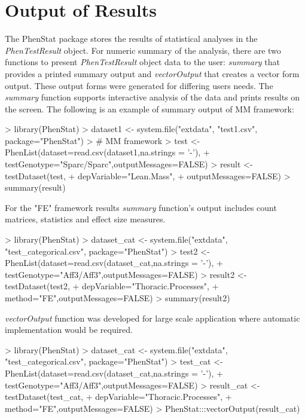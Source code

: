 \documentclass[a4paper]{article}
\begin{document}
\section{Output of Results}
The PhenStat package stores the results of statistical analyses in the \textit{PhenTestResult} object.
For numeric summary of the analysis, there are two functions to present \textit{PhenTestResult} object data to the user:
\textit{summary} that provides a printed summary output and \textit{vectorOutput} that creates a vector form output.
These output forms were generated for differing users needs.
\newline\newline
The \textit{summary} function supports interactive analysis of the data and prints results on the screen.
\newline\newline
The following is an example of summary output of MM framework:
\begin{Schunk}
\begin{Sinput}
> library(PhenStat)
> dataset1 <- system.file("extdata", "test1.csv", package="PhenStat")
> # MM framework
> test <- PhenList(dataset=read.csv(dataset1,na.strings = '-'),
+                  testGenotype="Sparc/Sparc",outputMessages=FALSE)
> result <- testDataset(test,
+                       depVariable="Lean.Mass",
+                       outputMessages=FALSE)
> summary(result)
\end{Sinput}
\end{Schunk}


For the "FE" framework results \textit{summary} function's output includes count matrices, statistics and
effect size measures.

\begin{Schunk}
\begin{Sinput}
> library(PhenStat)
> dataset_cat <- system.file("extdata", "test_categorical.csv", package="PhenStat")
> test2 <- PhenList(dataset=read.csv(dataset_cat,na.strings = '-'),
+                   testGenotype="Aff3/Aff3",outputMessages=FALSE)
> result2 <- testDataset(test2,
+                        depVariable="Thoracic.Processes",
+                        method="FE",outputMessages=FALSE)
> summary(result2)
\end{Sinput}
\end{Schunk}

\textit{vectorOutput} function was developed for large scale application where automatic implementation would be
required.

\begin{Schunk}
\begin{Sinput}
> library(PhenStat)
> dataset_cat <- system.file("extdata", "test_categorical.csv", package="PhenStat")
> test_cat <- PhenList(dataset=read.csv(dataset_cat,na.strings = '-'),
+                      testGenotype="Aff3/Aff3",outputMessages=FALSE)
> result_cat <- testDataset(test_cat,
+                           depVariable="Thoracic.Processes",
+                           method="FE",outputMessages=FALSE)
> PhenStat:::vectorOutput(result_cat)
\end{Sinput}
\end{Schunk}
\end{document}
